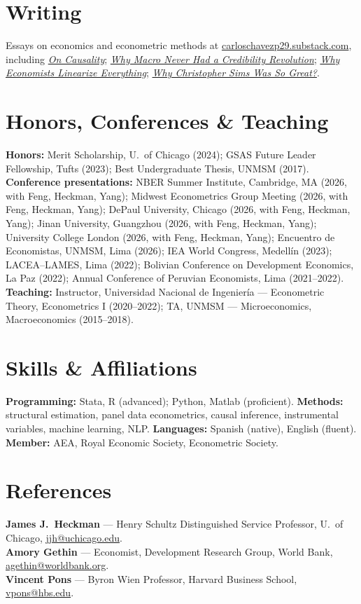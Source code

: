 \documentclass[11pt]{article}
\begin{document}
\section{Writing}
Essays on economics and econometric methods at \href{https://carloschavezp29.substack.com}{carloschavezp29.substack.com}, including \href{https://carloschavezp29.substack.com/p/on-causality}{\textit{On Causality}}; \href{https://carloschavezp29.substack.com/p/why-macro-never-had-a-credibility}{\textit{Why Macro Never Had a Credibility Revolution}}; \href{https://carloschavezp29.substack.com/p/why-economists-linearize-everything}{\textit{Why Economists Linearize Everything}}; \href{https://carloschavezp29.substack.com/p/why-christopher-sims-was-so-great}{\textit{Why Christopher Sims Was So Great?}}.

\section{Honors, Conferences \& Teaching}
\textbf{Honors:} Merit Scholarship, U.\ of Chicago (2024); GSAS Future Leader Fellowship, Tufts (2023); Best Undergraduate Thesis, UNMSM (2017).\\[3pt]
\textbf{Conference presentations:} NBER Summer Institute, Cambridge, MA (2026, with Feng, Heckman, Yang); Midwest Econometrics Group Meeting (2026, with Feng, Heckman, Yang); DePaul University, Chicago (2026, with Feng, Heckman, Yang); Jinan University, Guangzhou (2026, with Feng, Heckman, Yang); University College London (2026, with Feng, Heckman, Yang); Encuentro de Economistas, UNMSM, Lima (2026); IEA World Congress, Medellín (2023); LACEA--LAMES, Lima (2022); Bolivian Conference on Development Economics, La Paz (2022); Annual Conference of Peruvian Economists, Lima (2021--2022).\\[3pt]
\textbf{Teaching:} Instructor, Universidad Nacional de Ingeniería --- Econometric Theory, Econometrics I (2020--2022); TA, UNMSM --- Microeconomics, Macroeconomics (2015--2018).

\section{Skills \& Affiliations}
\textbf{Programming:} Stata, R (advanced); Python, Matlab (proficient). \quad \textbf{Methods:} structural estimation, panel data econometrics, causal inference, instrumental variables, machine learning, NLP. \quad \textbf{Languages:} Spanish (native), English (fluent). \quad \textbf{Member:} AEA, Royal Economic Society, Econometric Society.

\section{References}
\textbf{James J.\ Heckman} --- Henry Schultz Distinguished Service Professor, U.\ of Chicago, \href{mailto:jjh@uchicago.edu}{jjh@uchicago.edu}.\\
\textbf{Amory Gethin} --- Economist, Development Research Group, World Bank, \href{mailto:agethin@worldbank.org}{agethin@worldbank.org}.\\
\textbf{Vincent Pons} --- Byron Wien Professor, Harvard Business School, \href{mailto:vpons@hbs.edu}{vpons@hbs.edu}.
\end{document}
